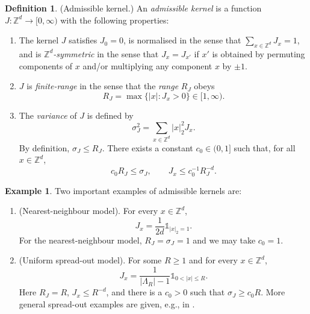 \documentclass[11pt,a4paper]{article}
\numberwithin{equation}{section}
\theoremstyle{plain}
\theoremstyle{definition}
\newtheorem{Def}[Thm]{Definition}
\newtheorem{Ex}[Thm]{Example}
\newcommand\1{\mathds{1}}
\begin{document}
\begin{Def}
\label{Def:J}
(Admissible kernel.)
An \emph{admissible kernel} is a function $J : \mathbb{Z}^d \to [0,\infty)$ with the
following properties:
\begin{enumerate}
\item[$(i)$]
The kernel $J$
satisfies $J_0=0$,
is normalised in the sense that
$\sum_{x\in\mathbb{Z}^d}J_x =1$, and is
\emph{$\mathbb{Z}^d$-symmetric} in the sense that $J_x=J_{x'}$ if $x'$ is obtained by permuting components of $x$ and/or multiplying any component $x$  by $\pm 1$.
\item[$(ii)$]
$J$ is \emph{finite-range} in the sense that
the \emph{range} $R_J$ obeys
\begin{equation}\label{eq:def range}
R_J=\max \{|x|: J_{x} >0\} \in [1,\infty).
\end{equation}
\item[$(iii)$]
The \emph{variance} of $J$ is defined by
\begin{equation}
\label{eq:Jvariance}
    \sigma_J^2 = \sum_{x\in \mathbb Z^d}|x|_2^2J_x.
\end{equation}
By definition, $\sigma_J \le R_J$. There exists a constant $c_0\in (0,1]$
such that, for all $x \in \mathbb{Z}^d$,
\begin{equation}
\label{eq:R_J comparable to xi(0)}
    c_0R_J \le \sigma_J,
    \qquad
    J_{x} \le c_0^{-1}R_J^{-d}.
\end{equation}
\end{enumerate}
\end{Def}



\begin{Ex}
Two important examples of admissible kernels are:
\begin{enumerate}
\item[$(i)$] (Nearest-neighbour model).
For every $x\in \mathbb Z^d$,
\begin{equation}
\label{eq:Jnn}
	J_x=\frac{1}{2d}\mathds{1}_{| x|_2=1}.
\end{equation}
For the nearest-neighbour model, $R_J=\sigma_J=1$ and we may take $c_0=1$.
\item[$(ii)$] (Uniform spread-out model).
For some $R\geq 1$ and for every $x\in \mathbb Z^d$,
\begin{equation}
\label{eq:Jso}
	J_x=\frac{1}{|\Lambda_R|-1}\mathds{1}_{0<|x|\leq R}.
\end{equation}
Here $R_J=R$,
$J_x \le R^{-d}$,
and there is a $c_0>0$ such that
$\sigma_J \ge c_0 R$.
More general spread-out examples are given, e.g., in \cite{HS90a,HHS03,Saka07}.
\end{enumerate}
\end{Ex}
\end{document}
